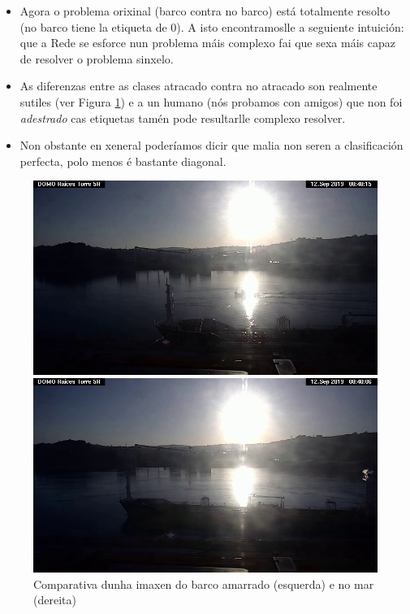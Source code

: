 \documentclass{article}
\begin{document}
\begin{itemize}
	\item Agora o problema orixinal (barco contra no barco) está totalmente resolto (no barco tiene la etiqueta de 0). A isto encontramoslle a seguiente intuición: que a Rede se esforce nun problema máis complexo fai que sexa máis capaz de resolver o problema sinxelo.
	\item As diferenzas entre as clases atracado contra no atracado son realmente sutiles (ver Figura \ref{fig:comparativaDoked}) e a un humano (nós probamos con amigos) que non foi \emph{adestrado} cas etiquetas tamén pode resultarlle complexo resolver. 
	\item Non obstante en xeneral poderíamos dicir que malia non seren a clasificación perfecta, polo  menos é bastante diagonal.
\end{itemize}


\begin{figure}[h]
	\centering
	\begin{minipage}{0.45\textwidth}
		\centering
		\includegraphics[width=\linewidth]{docked.jpg}
	\end{minipage}
	\hfill
	\begin{minipage}{0.45\textwidth}
		\centering
		\includegraphics[width=\linewidth]{undocked.jpg}
	\end{minipage}
	\label{fig:comparativaDoked}
	\caption{Comparativa dunha imaxen do barco amarrado (esquerda) e no mar (dereita)}
\end{figure}
\end{document}
